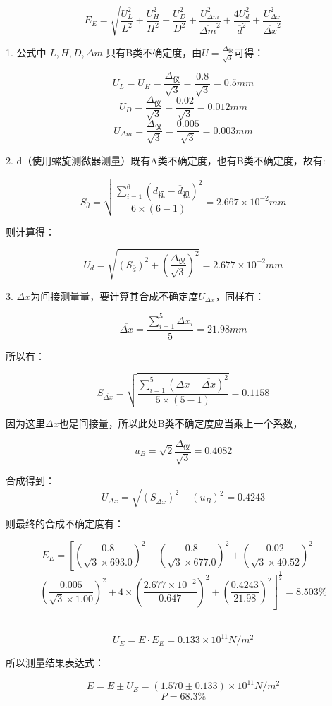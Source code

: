 \documentclass{ctexart}
\begin{document}
$$ E_E = \sqrt{\frac{U_L^2}{L^2}+\frac{U_H^2}{H^2}+\frac{U_D^2}{D^2}+\frac{U_{\Delta m}^2}{{\overline{\Delta m}}^2}+\frac{4 U_{d}^2}{{\overline{d}}^2}+\frac{U_{\Delta x}^2}{\overline{\Delta x}^2}} $$

1. 公式中 $L, H, D, \Delta m$ 只有B类不确定度，由$U = \frac{\Delta_仪}{\sqrt{3}}$可得：

$$ U_L = U_H = \frac{\Delta_\text{仪}}{\sqrt{3}} = \frac{0.8}{\sqrt{3}} = 0.5mm $$
$$ U_D = \frac{\Delta_\text{仪}}{\sqrt{3}} = \frac{0.02}{\sqrt{3}} = 0.012mm $$
$$ U_{\Delta m} = \frac{\Delta_\text{仪}}{\sqrt{3}} = \frac{0.005}{\sqrt{3}} = 0.003mm $$

2. d（使用螺旋测微器测量）既有A类不确定度，也有B类不确定度，故有:

$$ S_{\overline{d}} = \sqrt{\frac{\sum_{i=1}^{6}\left(d_{\text{视}}-\overline{d}_{\text{视}}\right)^2}{6\times(6-1)}} = 2.667 \times 10^{-2} mm $$

则计算得：

$$ U_d = \sqrt{(S_{\overline{d}})^2+(\frac{\Delta_仪}{\sqrt{3}})^2} = 2.677 \times 10^{-2} mm $$

3. $\Delta x$为间接测量量，要计算其合成不确定度$U_{\Delta x}$，同样有：

$$ \overline{\Delta x} = \frac{\sum_{i=1}^{5}\Delta x_i}{5} = 21.98 mm $$

所以有：

$$ S_{\overline{\Delta x}} = \sqrt{\frac{\sum_{i=1}^{5}\left(\Delta x -\overline{\Delta x}\right)^2}{5\times(5-1)}} = 0.1158 $$

因为这里$\Delta x$也是间接量，所以此处B类不确定度应当乘上一个系数，

$$u_B = \sqrt{2} \frac{\Delta_仪}{\sqrt{3}} = 0.4082 $$

合成得到：
$$ U_{\Delta x}=\sqrt{(S_{\overline{\Delta x}})^2+(u_B)^2} = 0.4243$$

则最终的合成不确定度有：

$$ E_E = \left[ \left(\frac{0.8}{\sqrt{3} \times 693.0 }\right)^2+\left(\frac{0.8}{\sqrt{3} \times 677.0}\right)^2+\left(\frac{0.02}{\sqrt{3} \times 40.52}\right)^2+\right. $$
$$\left.\left(\frac{0.005}{\sqrt{3} \times 1.00}\right)^2+4\times  \left(\frac{2.677 \times 10^{-2}}{0.647}\right)^2+\left(\frac{0.4243}{21.98}\right)^2\right]^{\frac{1}{2}} = 8.503\% $$

~
$$U_E = \overline{E} \cdot E_E = 0.133 \times 10^{11} N/m^2 $$

所以测量结果表达式：

$$ E = \overline{E} \pm U_E = (1.570 \pm 0.133) \times 10^{11} N/m^2 $$
$$P = 68.3\% $$
\end{document}
